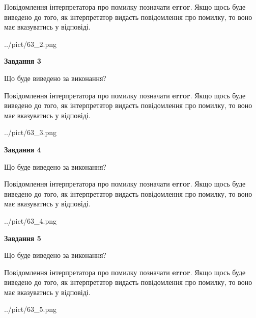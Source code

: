 \documentclass[12pt, ukrainian]{article}
\begin{document}
{\begin {large}
Повідомлення інтерпретатора про помилку позначати \textbf{error}.
Якщо щось буде виведено до того, як інтерпретатор видасть повідомлення про помилку, 
то воно має вказуватись у відповіді. \par


\begin{center}
	{../pict/63_2.png}
\end{center}
\newpage

{\begin {center}\textbf{Завдання 3}\end {center}}\par
Що буде виведено за виконання?

Повідомлення інтерпретатора про помилку позначати \textbf{error}.
Якщо щось буде виведено до того, як інтерпретатор видасть повідомлення про помилку, 
то воно має вказуватись у відповіді. \par


\begin{center}
	{../pict/63_3.png}
\end{center}
\newpage

{\begin {center}\textbf{Завдання 4}\end {center}}\par
Що буде виведено за виконання?

Повідомлення інтерпретатора про помилку позначати \textbf{error}.
Якщо щось буде виведено до того, як інтерпретатор видасть повідомлення про помилку, 
то воно має вказуватись у відповіді. \par


\begin{center}
	{../pict/63_4.png}
\end{center}
\newpage

{\begin {center}\textbf{Завдання 5}\end {center}}\par
Що буде виведено за виконання?

Повідомлення інтерпретатора про помилку позначати \textbf{error}.
Якщо щось буде виведено до того, як інтерпретатор видасть повідомлення про помилку, 
то воно має вказуватись у відповіді. \par


\begin{center}
	{../pict/63_5.png}
\end{center}
\newpage


\end{large}}
\end{document}
